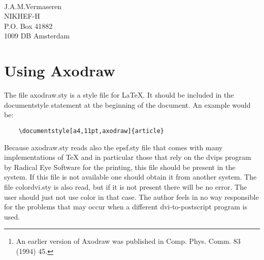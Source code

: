 
\def\KeyWord#1{$\backslash$\IfColor{$\!\!$\textRed{#1}\textBlack}{#1}$\!\!$}



\begin{center}
{\Huge {}} \\
\vspace{3cm}
{\LARGE  J.A.M.Vermaseren} \\
\vspace{4mm}
NIKHEF-H \\ P.O. Box 41882 \\ 1009 DB Amsterdam \\ \vspace{5mm}
\end{center}

\vspace{5cm}

\begin{abstract}
Axodraw is a set of drawing primitives for use in \LaTeX. These can be used 
for the drawing of Feynman diagrams, flow charts and simple graphics. 
Because it uses postscript for its drawing commands it works only in 
combination with the dvips of Radical Eye Software which is presently the 
most popular dvips program. More will be added in the future. It allows 
whole articles including their pictures to be contained in a single file, 
thereby making it easier to exchange the article file by e-mail. The 
current version\footnote{An earlier version of Axodraw was published 
in Comp. Phys. Comm. 83 (1994) 45.} supports color according to the scheme 
implemented in the file colordvi.sty which comes with most \TeX{} 
distributions.
\end{abstract}

\newpage

\section{Using Axodraw}

The file axodraw.sty is a style file for \LaTeX{}. It should be included 
in the documentstyle statement at the beginning of the 
document. An example would be: \IfColor{\textBlue}{}
\begin{verbatim}
    \documentstyle[a4,11pt,axodraw]{article}
\end{verbatim}
\IfColor{\textBlack}{}
Because axodraw.sty reads also the epsf.sty file that comes with many 
implementations of \TeX{} and in particular those that rely on the dvips 
program by Radical Eye Software for the printing, this file should be 
present in the system. If this file is not available one should obtain it 
from another system. The file colordvi.sty is also read, but if it is not 
present there will be no error. The user should just not use color in that 
case. The author feels in no way responsible for the problems that may 
occur when a different dvi-to-postscript program is used.

